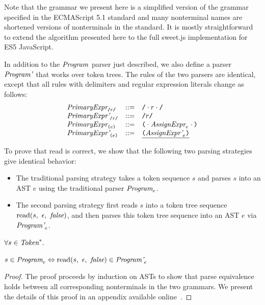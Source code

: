\documentclass[preprint,10pt]{sigplanconf}
\begin{document}
Note that the grammar we present here is a simplified version of the
grammar specified in the ECMAScript 5.1 standard \cite{International2011}
and many nonterminal names are shortened
versions of nonterminals in the standard.
It is mostly straightforward to extend the algorithm
presented here 
to 
the full sweet.js implementation for ES5 JavaScript.

In addition to the \( \textit{Program}_{} \) parser just described, we
also define a parser \( \textit{Program'}_{} \) that works over token
trees. The rules of the two parsers are identical, except that
all rules with delimiters and regular expression literals change as follows:
\[
\begin{array}{lcl}
  \textit{PrimaryExpr}_{\texttt{/}r\texttt{/}} &::=& \texttt{/}\cdot r \cdot \texttt{/}
  \\
  \textit{PrimaryExpr'}_{\texttt{/}r\texttt{/}} &::=& \texttt{/}r\texttt{/}
  \\
  \textit{PrimaryExpr}_{\texttt{(} e \texttt{)}} &::=& 
  \texttt{(} \cdot \textit{AssignExpr}_{e} \cdot \texttt{)}
  \\
  \textit{PrimaryExpr'}_{\texttt{(} e \texttt{)}} &::=& 
  \underline{ \texttt{(} \textit{AssignExpr'}_{e} \texttt{)}}
  \\
\end{array}
\]

To prove that read is correct, we show that the following two parsing
strategies give identical behavior:
\begin{itemize}
\item The traditional parsing strategy takes a token sequence \( s
  \) and parses \( s \) into an AST \( e \) using the traditional parser
  \( \textit{Program}_{e} \).

\item The second parsing strategy first reads \( s \) into a token
  tree sequence \( \textrm{read}(s,~\epsilon,~\textit{false}) \), and then parses
  this token tree sequence into an AST \( e \) via \( \textit{Program'}_{e} \).
\end{itemize}

\begin{theorem}\mbox{}

  \( \forall s \in \textit{Token}^*. \)

  \( s \in \textit{Program}_{e} \Leftrightarrow 
  \textrm{read}(s,~\epsilon,~\textit{false}) \in \textit{Program'}_{e} \)

\end{theorem}
\begin{proof}\mbox{}
  The proof proceeds by induction on ASTs to show that parse
  equivalence holds between all corresponding nonterminals in the two
  grammars. We present the details of this proof in an
  appendix available online~\cite{sweetjsappendix}.
\end{proof}
\end{document}
